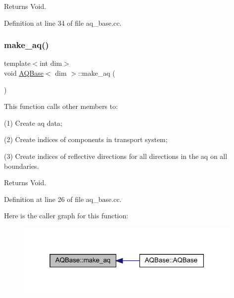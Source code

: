 \begin{DoxyReturn}{Returns}
Void. 
\end{DoxyReturn}


Definition at line 34 of file aq\+\_\+base.\+cc.

\mbox{\label{class_a_q_base_ad8bf7c63bde67a2f514aea2c589983dd}} 
\subsubsection{\texorpdfstring{make\+\_\+aq()}{make\_aq()}}
{\footnotesize\ttfamily template$<$int dim$>$ \\
void \hyperlink{class_a_q_base}{A\+Q\+Base}$<$ dim $>$\+::make\+\_\+aq (\begin{DoxyParamCaption}{ }\end{DoxyParamCaption})}

This function calls other members to\+:

(1) Create aq data;

(2) Create indices of components in transport system;

(3) Create indices of reflective directions for all directions in the aq on all boundaries.

\begin{DoxyReturn}{Returns}
Void. 
\end{DoxyReturn}


Definition at line 26 of file aq\+\_\+base.\+cc.

Here is the caller graph for this function\+:\nopagebreak
\begin{figure}[H]
\begin{center}
\leavevmode
\includegraphics[width=313pt]{class_a_q_base_ad8bf7c63bde67a2f514aea2c589983dd_icgraph}
\end{center}
\end{figure}
\mbox{\label{class_a_q_base_adbe2961a0c0db888ca6a22ead08732eb}} 

